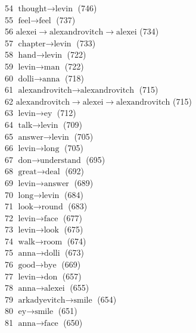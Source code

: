 \begin{appendices}
    54  $ \text{thought} \to \text{levin} $ (746) \\
    55  $ \text{feel} \to \text{feel} $ (737) \\
    56  $ \text{alexei} \to \text{alexandrovitch} \to \text{alexei} $ (734) \\
    57  $ \text{chapter} \to \text{levin} $ (733) \\
    58  $ \text{hand} \to \text{levin} $ (722) \\
    59  $ \text{levin} \to \text{man} $ (722) \\
    60  $ \text{dolli} \to \text{anna} $ (718) \\
    61  $ \text{alexandrovitch} \to \text{alexandrovitch} $ (715) \\
    62  $ \text{alexandrovitch} \to \text{alexei} \to \text{alexandrovitch} $ (715) \\
    63  $ \text{levin} \to \text{ey} $ (712) \\
    64  $ \text{talk} \to \text{levin} $ (709) \\
    65  $ \text{answer} \to \text{levin} $ (705) \\
    66  $ \text{levin} \to \text{long} $ (705) \\
    67  $ \text{don} \to \text{understand} $ (695) \\
    68  $ \text{great} \to \text{deal} $ (692) \\
    69  $ \text{levin} \to \text{answer} $ (689) \\
    70  $ \text{long} \to \text{levin} $ (684) \\
    71  $ \text{look} \to \text{round} $ (683) \\
    72  $ \text{levin} \to \text{face} $ (677) \\
    73  $ \text{levin} \to \text{look} $ (675) \\
    74  $ \text{walk} \to \text{room} $ (674) \\
    75  $ \text{anna} \to \text{dolli} $ (673) \\
    76  $ \text{good} \to \text{bye} $ (669) \\
    77  $ \text{levin} \to \text{don} $ (657) \\
    78  $ \text{anna} \to \text{alexei} $ (655) \\
    79  $ \text{arkadyevitch} \to \text{smile} $ (654) \\
    80  $ \text{ey} \to \text{smile} $ (651) \\
    81  $ \text{anna} \to \text{face} $ (650) \\

\end{appendices}
